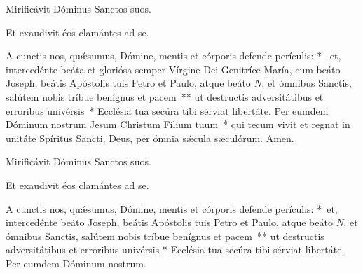 \vv Mirificávit Dóminus Sanctos suos.

\rr Et exaudivit éos clamántes ad se.

\oratio

\lettrine{A}{} cunctis nos, quǽsumus, Dómine, mentis et córporis defende perículis: \nolinebreak[4]*~ et, intercedénte beáta et gloriósa semper Vírgine Dei Genitríce María, cum beáto Joseph, beátis Apóstolis tuis Petro et Paulo, atque beáto \textit{N.} et ómnibus Sanctis, salútem nobis tríbue benígnus et pacem~** ut destructis adversitátibus et erroribus univérsis~* Ecclésia tua secúra tibi sérviat libertáte. Per eumdem Dóminum nostrum Jesum Christum Fílium tuum~* qui tecum vivit et regnat in unitáte Spíritus Sancti, Deus, per ómnia sǽcula sæculórum. \rr Amen.



\vv Mirificávit Dóminus Sanctos suos.

\rr Et exaudivit éos clamántes ad se.

\oratio

\lettrine{A}{} cunctis nos, quǽsumus, Dómine, mentis et córporis defende perículis: \nolinebreak[4]*~et, intercedénte beáto Joseph, beátis Apóstolis tuis Petro et Paulo, atque beáto \textit{N.} et ómnibus Sanctis, salútem nobis tríbue benígnus et pacem~** ut destructis adversitátibus et erroribus univérsis * Ecclésia tua secúra tibi sérviat libertáte. Per eumdem Dóminum nostrum.